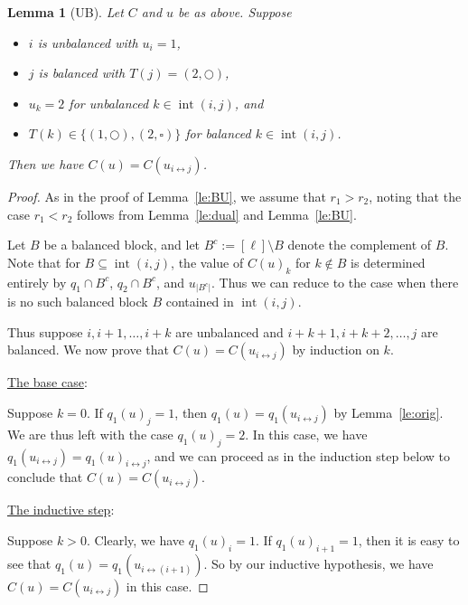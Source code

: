 \documentclass[reqno]{amsart}
\newcommand{\0}{\phantom{c}}
\DeclareMathOperator{\inter}{int} %
\theoremstyle{plain}
\newtheorem{lemma}[thm]{Lemma}
\theoremstyle{definition}
\numberwithin{equation}{section}
\begin{document}

\begin{lemma}[UB]
\label{le:UB}
  Let $C$ and $u$ be as above.
  Suppose
  \begin{itemize}
    \item $i$ is unbalanced with $u_i = 1$,
    \item $j$ is balanced with $T(j) = (2,\bigcirc)$,
    \item $u_k = 2$ for unbalanced $k \in \inter(i,j)$, and
    \item $T(k) \in \{(1,\bigcirc),(2,\square)\}$ for balanced $k \in \inter(i,j)$.
  \end{itemize}
  Then we have $C(u) = C(u_{i \leftrightarrow j})$.
\end{lemma}

\begin{proof}
  As in the proof of Lemma~\ref{le:BU}, we assume that $r_1 > r_2$, noting that the case $r_1 < r_2$ follows from Lemma~\ref{le:dual} and Lemma~\ref{le:BU}.
  
  Let $B$ be a balanced block, and let $B^c := [\ell] \setminus B$ denote the complement of $B$.
  Note that for $B \subseteq \inter(i,j)$, the value of $C(u)_k$ for $k \notin B$ is determined entirely by $q_1\cap B^c$, $q_2\cap B^c$, and $u_{\lvert B^c \rvert}$.
  Thus we can reduce to the case when there is no such balanced block $B$ contained in $\inter(i,j)$.  

  Thus suppose $i, i+1, \dotsc, i+k$ are unbalanced and $i+k+1, i+k+2, \dotsc, j$ are balanced.
  We now prove that $C(u) = C(u_{i \leftrightarrow j})$ by induction on $k$. 
  
  \vspace{10pt}
  \noindent \underline{The base case}:

  Suppose $k = 0$.
  If $q_1(u)_j = 1$, then $q_1(u) = q_1(u_{i \leftrightarrow j})$ by Lemma~\ref{le:orig}.
  We are thus left with the case $q_1(u)_j = 2$.
  In this case, we have  $q_1(u_{i \leftrightarrow j}) = q_1(u)_{i \leftrightarrow j}$, and we can proceed as in the induction step below to conclude that $C(u) = C(u_{i \leftrightarrow j})$.

  \vspace{10pt}
  \noindent \underline{The inductive step}:

  Suppose $k > 0$.
  Clearly, we have $q_1(u)_i = 1$.
  If $q_1(u)_{i+1} = 1$, then it is easy to see that $q_1(u) = q_1(u_{i\leftrightarrow (i+1)})$.
  So by our inductive hypothesis, we have $C(u) = C(u_{i\leftrightarrow j})$ in this case. 


\end{proof}
\end{document}
